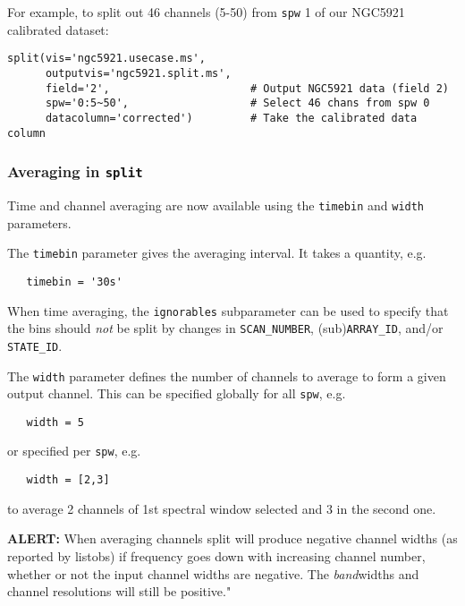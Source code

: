 For example, to split out 46 channels (5-50) from {\tt spw} 1 of
our NGC5921 calibrated dataset:
\small
\begin{verbatim}
split(vis='ngc5921.usecase.ms',       
      outputvis='ngc5921.split.ms',    
      field='2',                      # Output NGC5921 data (field 2)
      spw='0:5~50',                   # Select 46 chans from spw 0
      datacolumn='corrected')         # Take the calibrated data column
\end{verbatim}
\normalsize

\subsubsection{Averaging in {\tt split}}
\label{section:cal.other.split.average}

Time and channel averaging are now available using the {\tt timebin}
and {\tt width} parameters.

The {\tt timebin} parameter gives the averaging interval.  It takes a
quantity, e.g.
\small
\begin{verbatim}
   timebin = '30s'
\end{verbatim}
\normalsize

When time averaging, the {\tt ignorables} subparameter can be used to
specify that the bins should \emph{not} be split by changes in
{\tt SCAN\_NUMBER}, (sub){\tt ARRAY\_ID}, and/or {\tt STATE\_ID}.


The {\tt width} parameter defines the number of channels to average to
form a given output channel.  This can be specified globally for all
{\tt spw}, e.g.

\small
\begin{verbatim}
   width = 5
\end{verbatim}
\normalsize

or specified per {\tt spw}, e.g.

\small
\begin{verbatim}
   width = [2,3]
\end{verbatim}
\normalsize

to average 2 channels of 1st spectral window selected and 3 in the 
second one.


{\bf ALERT:} When averaging channels split will produce negative channel widths
(as reported by listobs) if frequency goes down with increasing channel
number, whether or not the input channel widths are negative.  The
\emph{band}widths and channel resolutions will still be positive."


